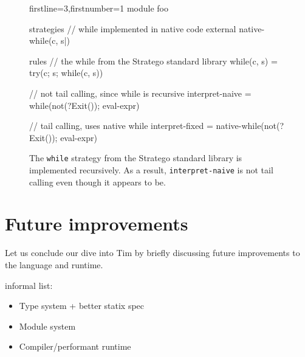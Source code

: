 \begin{figure}
  \begin{stratego*}{firstline=3,firstnumber=1}
module foo

strategies
  // while implemented in native code
  external native-while(c, s|)

rules
  // the while from the Stratego standard library
  while(c, s) = try(c; s; while(c, s))

  // not tail calling, since while is recursive
  interpret-naive = while(not(?Exit()); eval-expr)

  // tail calling, uses native while
  interpret-fixed = native-while(not(?Exit()); eval-expr)
  \end{stratego*}
  \caption{The \texttt{while} strategy from the Stratego standard library is implemented recursively. As a result, \texttt{interpret-naive} is not tail calling even though it appears to be.}
  \label{fig:tim_interpreter_cps}
\end{figure}

\section{Future improvements}
\label{sec:tim_future}
Let us conclude our dive into Tim by briefly discussing future improvements to the language and runtime. 


informal list: 
\begin{itemize}
  \item Type system + better statix spec
  \item Module system
  \item Compiler/performant runtime
\end{itemize}

